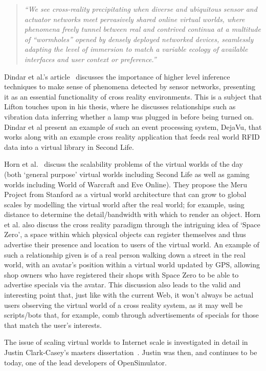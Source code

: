 \begin{quote}
\textit{``We see cross-reality precipitating when diverse and ubiquitous sensor and actuator networks meet pervasively shared online virtual worlds, where phenomena freely tunnel between real and contrived continua at a multitude of ``wormholes'' opened by densely deployed networked devices, seamlessly adapting the level of immersion to match a variable ecology of available interfaces and user context or preference.''}
\end{quote}

Dindar et al.'s article~\cite{Dindar2009} discusses the importance of higher level inference techniques to make sense of phenomena detected by sensor networks, presenting it as an essential functionality of cross reality environments. This is a subject that Lifton touches upon in his thesis, where he discusses relationships such as vibration data inferring whether a lamp was plugged in before being turned on. Dindar et al present an example of such an event processing system, DejaVu, that works along with an example cross reality application that feeds real world RFID data into a virtual library in Second Life.

Horn et al.~\cite{Horn2009} discuss the scalability problems of the virtual worlds of the day (both `general purpose' virtual worlds including Second Life as well as gaming worlds including World of Warcraft and Eve Online). They propose the Meru Project from Stanford as a virtual world architecture that can grow to global scales by modelling the virtual world after the real world; for example, using distance to determine the detail/bandwidth with which to render an object. Horn et al. also discuss the cross reality paradigm through the intriguing idea of `Space Zero', a space within which physical objects can register themselves and thus advertise their presence and location to users of the virtual world. An example of such a relationship given is of a real person walking down a street in the real world, with an avatar's position within a virtual world updated by GPS, allowing shop owners who have registered their shops with Space Zero to be able to advertise specials via the avatar. This discussion also leads to the valid and interesting point that, just like with the current Web, it won't always be actual users observing the virtual world of a cross reality system, as it may well be scripts/bots that, for example, comb through advertisements of specials for those that match the user's interests.

The issue of scaling virtual worlds to Internet scale is investigated in detail in Justin Clark-Casey's masters dissertation~\cite{Clark-Casey2010}. Justin was then, and continues to be today, one of the lead developers of OpenSimulator.

